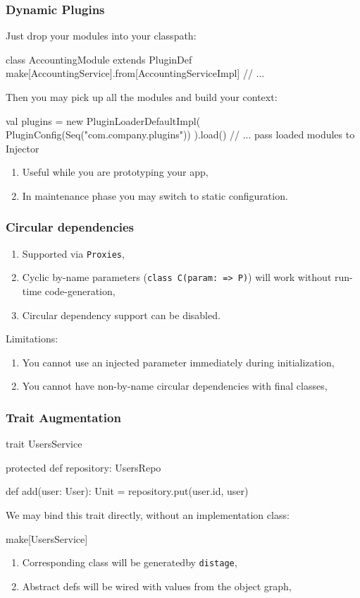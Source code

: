 \documentclass[usenames,dvipsnames]{beamer}
\newcommand{\distage}{\texttt{distage}\xspace}
\begin{document}
\begin{frame}[fragile]
  \frametitle{Dynamic Plugins}
  Just drop your modules into your classpath:
  \begin{scalacode}
class AccountingModule extends PluginDef {
  make[AccountingService].from[AccountingServiceImpl]
  // ...
}
  \end{scalacode}
  Then you may pick up all the modules and build your context:
  \begin{scalacode}
val plugins = new PluginLoaderDefaultImpl(
  PluginConfig(Seq("com.company.plugins"))
).load()
// ... pass loaded modules to Injector
  \end{scalacode}
  \begin{enumerate}
  \item Useful while you are prototyping your app,
  \item In maintenance phase you may switch to static configuration.
  \end{enumerate}
\end{frame}

\begin{frame}
  \frametitle{Circular dependencies}
  \begin{enumerate}
    \item Supported via \texttt{Proxies},
    \item Cyclic by-name parameters (\texttt{class C(param: => P)}) will work without run-time code-generation,
    \item Circular dependency support can be disabled.
  \end{enumerate}

  Limitations:
  \begin{enumerate}
    \item You cannot use an injected parameter immediately during initialization,
    \item You cannot have non-by-name circular dependencies with final classes,
  \end{enumerate}
\end{frame}

\begin{frame}[fragile]
\frametitle{Trait Augmentation}
\begin{scalacode}
trait UsersService {
  protected def repository: UsersRepo

  def add(user: User): Unit = {
    repository.put(user.id, user)
  }
}
\end{scalacode}
We may bind this trait directly, without an implementation class:

\begin{scalacode}
make[UsersService]
\end{scalacode}

\begin{enumerate}
\item Corresponding class will be generated\footnotemark[1] by \distage,
\item Abstract defs will be wired with values from the object graph,
\end{enumerate}

\end{frame}
\end{document}
